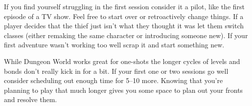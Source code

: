 If you find yourself struggling in the first session consider it a pilot, like the first episode of a TV show. Feel free to start over or retroactively change things. If a player decides that the thief just isn't what they thought it was let them switch classes (either remaking the same character or introducing someone new). If your first adventure wasn't working too well scrap it and start something new.


While Dungeon World works great for one-shots the longer cycles of levels and bonds don't really kick in for a bit. If your first one or two sessions go well consider scheduling out enough time for 5--10 more. Knowing that you're planning to play that much longer gives you some space to plan out your fronts and resolve them.


